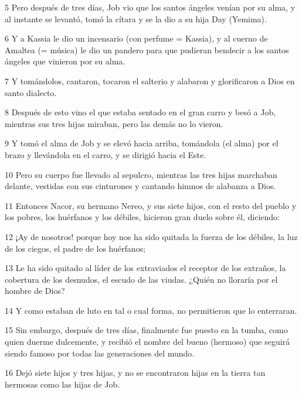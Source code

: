 \par 5 Pero después de tres días, Job vio que los santos ángeles venían por su alma, y ​​al instante se levantó, tomó la cítara y se la dio a su hija Day (Yemima).

\par 6 Y a Kassia le dio un incensario (con perfume = Kassia), y al cuerno de Amaltea (= música) le dio un pandero para que pudieran bendecir a los santos ángeles que vinieron por su alma.

\par 7 Y tomándolos, cantaron, tocaron el salterio y alabaron y glorificaron a Dios en santo dialecto.

\par 8 Después de esto vino el que estaba sentado en el gran carro y besó a Job, mientras sus tres hijas miraban, pero las demás no lo vieron.

\par 9 Y tomó el alma de Job y se elevó hacia arriba, tomándola (el alma) por el brazo y llevándola en el carro, y se dirigió hacia el Este.

\par 10 Pero su cuerpo fue llevado al sepulcro, mientras las tres hijas marchaban delante, vestidas con sus cinturones y cantando himnos de alabanza a Dios.

\par 11 Entonces Nacor, su hermano Nereo, y sus siete hijos, con el resto del pueblo y los pobres, los huérfanos y los débiles, hicieron gran duelo sobre él, diciendo:

\par 12 ¡Ay de nosotros! porque hoy nos ha sido quitada la fuerza de los débiles, la luz de los ciegos, el padre de los huérfanos;

\par 13 Le ha sido quitado al líder de los extraviados el receptor de los extraños, la cobertura de los desnudos, el escudo de las viudas. ¿Quién no lloraría por el hombre de Dios?

\par 14 Y como estaban de luto en tal o cual forma, no permitieron que lo enterraran.

\par 15 Sin embargo, después de tres días, finalmente fue puesto en la tumba, como quien duerme dulcemente, y recibió el nombre del bueno (hermoso) que seguirá siendo famoso por todas las generaciones del mundo.

\par 16 Dejó siete hijos y tres hijas, y no se encontraron hijas en la tierra tan hermosas como las hijas de Job.

